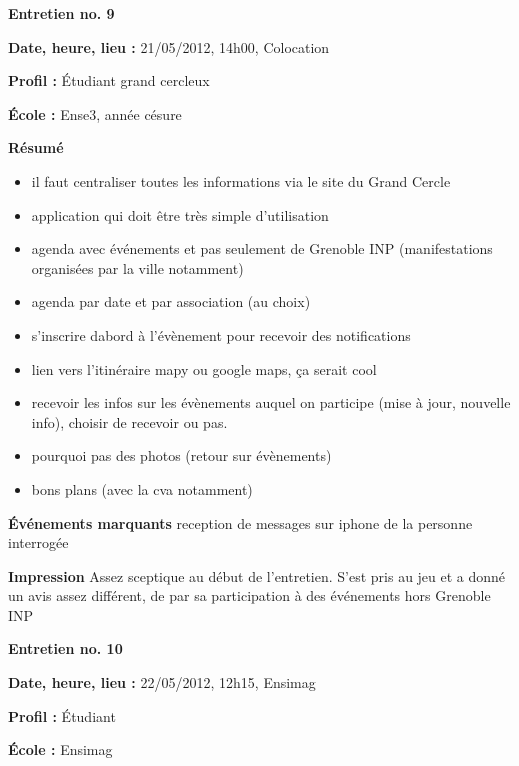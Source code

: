 \documentclass[a4paper, 11px]{article}
\begin{document}
 \textbf {\large Entretien no. 9}

\textbf{Date, heure, lieu : }
21/05/2012, 14h00, Colocation

\textbf{Profil : }
Étudiant grand cercleux

\textbf{École : }
Ense3, année césure

\textbf{Résumé}
	\begin{itemize}
		\item il faut centraliser toutes les informations via le site du Grand Cercle
		\item application qui doit être très simple d'utilisation
		\item agenda avec événements et pas seulement de Grenoble INP (manifestations organisées par la ville notamment)
		\item agenda par date et par association (au choix)
		\item s’inscrire dabord à l’évènement pour recevoir des notifications
		\item lien vers l’itinéraire mapy ou google maps, ça serait cool
		\item recevoir les infos sur les évènements auquel on participe (mise à jour, nouvelle
     info), choisir de recevoir ou pas.
		\item pourquoi pas des photos (retour sur évènements)
		\item bons plans (avec la cva notamment)

	\end{itemize}

\textbf{Événements marquants}
reception de messages sur iphone de la personne interrogée

\textbf{Impression}
Assez sceptique au début de l'entretien. S'est pris au jeu et a donné un avis assez différent, de par sa participation à des événements hors Grenoble INP



\vspace{.3cm}

 \textbf {\large Entretien no. 10}

\textbf{Date, heure, lieu : }
22/05/2012, 12h15, Ensimag

\textbf{Profil : }
Étudiant

\textbf{École : }
Ensimag
\end{document}
